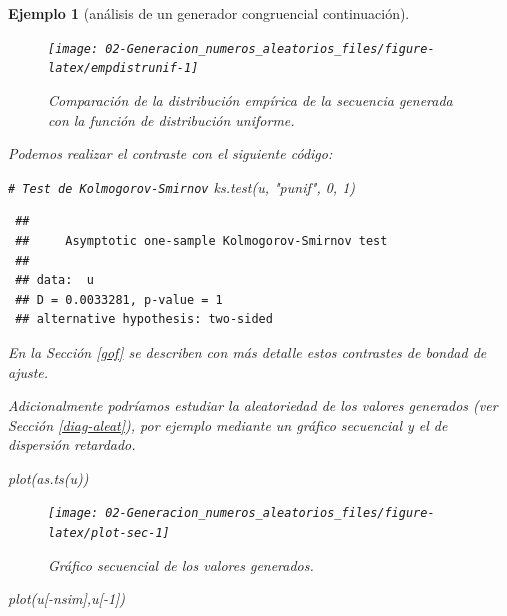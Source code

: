 \documentclass[
]{book}
\newenvironment{Shaded}{\begin{snugshade}}{\end{snugshade}}
\newcommand{\CommentTok}[1]{\textcolor[rgb]{0.56,0.35,0.01}{\textit{#1}}}
\newcommand{\DecValTok}[1]{\textcolor[rgb]{0.00,0.00,0.81}{#1}}
\newcommand{\FunctionTok}[1]{\textcolor[rgb]{0.00,0.00,0.00}{#1}}
\newcommand{\NormalTok}[1]{#1}
\newcommand{\SpecialCharTok}[1]{\textcolor[rgb]{0.00,0.00,0.00}{#1}}
\newcommand{\StringTok}[1]{\textcolor[rgb]{0.31,0.60,0.02}{#1}}
\theoremstyle{break}
\newtheorem{example}{Ejemplo}[chapter]
\theoremstyle{nonumberplain}
\renewcommand{\CommentTok}[1]{\textcolor[rgb]{0.41,0.41,0.41}{\texttt{#1}}}
\begin{document}
\begin{example}[análisis de un generador congruencial continuación]
\begin{figure}[!htb]
{\centering \texttt{[image: 02-Generacion\_numeros\_aleatorios\_files/figure-latex/empdistrunif-1]} 

}

\caption{Comparación de la distribución empírica de la secuencia generada con la función de distribución uniforme.}\label{fig:empdistrunif}
\end{figure}

Podemos realizar el contraste con el siguiente código:

\begin{Shaded}
\begin{Highlighting}[]
\CommentTok{\# Test de Kolmogorov{-}Smirnov}
\FunctionTok{ks.test}\NormalTok{(u, }\StringTok{"punif"}\NormalTok{, }\DecValTok{0}\NormalTok{, }\DecValTok{1}\NormalTok{)}
\end{Highlighting}
\end{Shaded}

\begin{verbatim}
 ## 
 ##     Asymptotic one-sample Kolmogorov-Smirnov test
 ## 
 ## data:  u
 ## D = 0.0033281, p-value = 1
 ## alternative hypothesis: two-sided
\end{verbatim}

En la Sección \ref{gof} se describen con más detalle estos contrastes de bondad de ajuste.

Adicionalmente podríamos estudiar la aleatoriedad de los valores generados (ver Sección \ref{diag-aleat}), por ejemplo mediante un gráfico secuencial y el de dispersión retardado.

\begin{Shaded}
\begin{Highlighting}[]
\FunctionTok{plot}\NormalTok{(}\FunctionTok{as.ts}\NormalTok{(u))}
\end{Highlighting}
\end{Shaded}

\begin{figure}[!htb]

{\centering \texttt{[image: 02-Generacion\_numeros\_aleatorios\_files/figure-latex/plot-sec-1]} 

}

\caption{Gráfico secuencial de los valores generados.}\label{fig:plot-sec}
\end{figure}

\begin{Shaded}
\begin{Highlighting}[]
\FunctionTok{plot}\NormalTok{(u[}\SpecialCharTok{{-}}\NormalTok{nsim],u[}\SpecialCharTok{{-}}\DecValTok{1}\NormalTok{])}
\end{Highlighting}
\end{Shaded}


\end{example}
\end{document}
